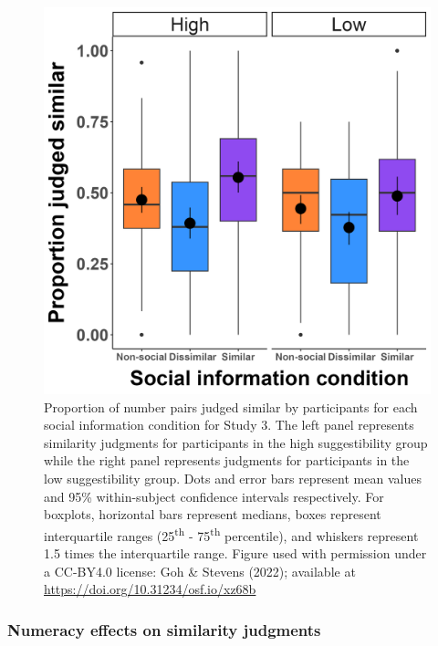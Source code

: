 \documentclass[
  pub,floatsintext]{apa6}
\begin{document}
\begin{figure}

{\centering \includegraphics[width=1\linewidth]{figures/suggestibility_social_info_3} 

}

\caption{Proportion of number pairs judged similar by participants for each social information condition for Study 3. The left panel represents similarity judgments for participants in the high suggestibility group while the right panel represents judgments for participants in the low suggestibility group. Dots and error bars represent mean values and 95\% within-subject confidence intervals respectively. For boxplots, horizontal bars represent medians, boxes represent interquartile ranges (25\textsuperscript{th} - 75\textsuperscript{th} percentile), and whiskers represent 1.5 times the interquartile range. Figure used with permission under a CC-BY4.0 license: Goh \& Stevens (2022); available at \url{https://doi.org/10.31234/osf.io/xz68b}}\label{fig:suggestibility3}
\end{figure}

\hypertarget{numeracy-effects-on-similarity-judgments}{%
\subsubsection{Numeracy effects on similarity judgments}\label{numeracy-effects-on-similarity-judgments}}
\end{document}
